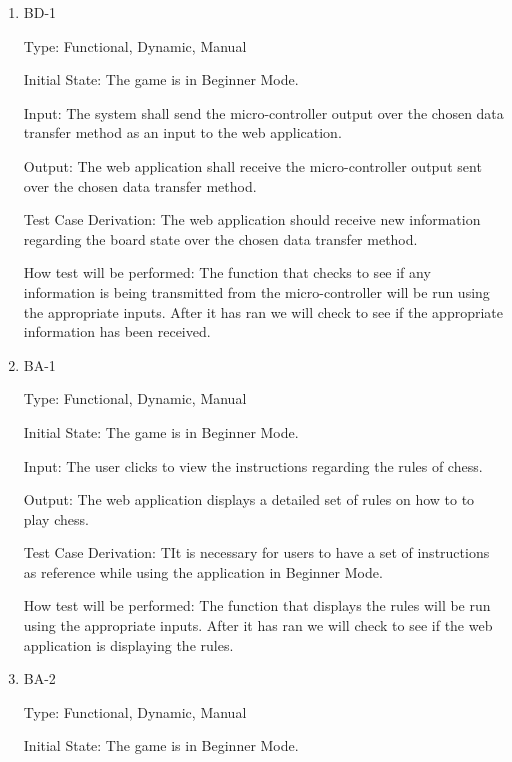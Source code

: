 \documentclass[12pt, titlepage]{article}
\begin{document}
\begin{enumerate}
    \item{BD-1\\}

    Type: Functional, Dynamic, Manual
                      
    Initial State: The game is in Beginner Mode.
                        
    Input: The system shall send the micro-controller output over the chosen data transfer
    method as an input to the web application.
                        
    Output: The web application shall receive the micro-controller output sent over the chosen data transfer
    method.
                        
    Test Case Derivation: The web application should receive new information regarding the board state over the chosen data transfer method. 

    How test will be performed: The function that checks to see if any information is being transmitted from the micro-controller
    will be run using the appropriate inputs. After it has ran we will check to see if the appropriate information has been received.

    \item{BA-1\\}

    Type: Functional, Dynamic, Manual
                      
    Initial State: The game is in Beginner Mode.
                        
    Input: The user clicks to view the instructions regarding the rules of chess.
                        
    Output: The web application displays a detailed set of rules on how to to play chess.
                        
    Test Case Derivation: TIt is necessary for users to have a set of instructions as reference while
    using the application in Beginner Mode.

    How test will be performed: The function that displays the rules
    will be run using the appropriate inputs. After it has ran we will check to see if the web application is displaying the rules.

    \item{BA-2\\}

    Type: Functional, Dynamic, Manual
                      
    Initial State: The game is in Beginner Mode.
                        

\end{enumerate}
\end{document}
